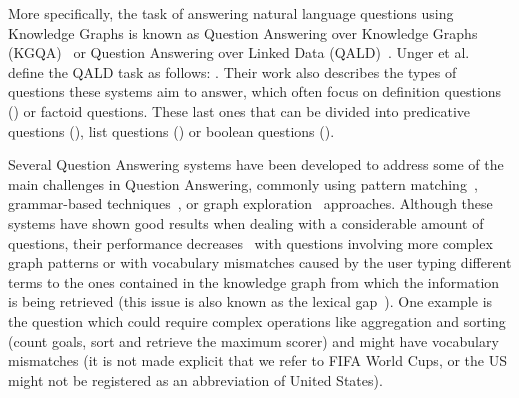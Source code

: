 More specifically, the task of answering natural language questions using Knowledge Graphs 
is known as Question Answering over Knowledge Graphs (KGQA)~\cite{qa:nn-qakg-Chakraborty19} or Question 
Answering over Linked Data (QALD)~\cite{qa:intro-UngerFC14, qa:qald-Lopezetal2013}. Unger et 
al.~\cite{qa:intro-UngerFC14} define the QALD task as follows: . Their work also describes the types of questions these systems 
aim to answer, which often focus on definition questions () or factoid 
questions. These last ones that can be divided into predicative questions (), list questions () or boolean questions 
(). 

Several Question Answering systems have been developed to address some of the main 
challenges in Question Answering, commonly using pattern matching~\cite{qa:pattern-FaderZE13, 
qa:pattern-LopezFMS12}, grammar-based techniques~\cite{qa:grammar-DamljanovicAC10, 
qa:grammar-2-Marginean17}, or graph exploration~\cite{qa:graph-XuFZ14, qa:graph-2-ZouHWYHZ14} 
approaches. Although these systems have shown good results when dealing with a considerable amount of 
questions, their performance decreases~\cite{qa:challenges-semweb-HoffnerWMULN17} with questions 
involving more complex graph patterns or with vocabulary mismatches caused by the user typing 
different terms to the ones contained in the knowledge graph from which the information is being 
retrieved (this issue is also known as the lexical gap~\cite{semPar:lexical-gap-HakimovUWC15}). One 
example is the question  which could 
require complex operations like aggregation and sorting (count goals, sort and retrieve the maximum 
scorer) and might have vocabulary mismatches (it is not made explicit that we refer to FIFA World 
Cups, or the US might not be registered as an abbreviation of United States).

